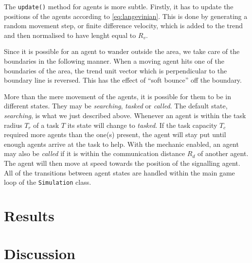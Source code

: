 \documentclass[11pt]{article}
\begin{document}
    The \lstinline!update()! method for agents is more subtle. Firstly, it has to 
    update the positions of the agents according to \autoref{eq:langevinian}. 
    This is done by generating a random movement step, or finite difference velocity,
    which is added to the trend and then normalised to have lenght equal to $R_v$.

    Since it is possible for an agent to wander outside the area, we take care of 
    the boundaries in the following manner. When a moving agent hits one of the
    boundaries of the area, the trend unit vector which is perpendicular to 
    the boundary line is reversed. This has the effect of ``soft bounce'' 
    off the boundary.

    More than the mere movement of the agents, it is possible for them to be in
    different states. They may be \emph{searching}, \emph{tasked} or \emph{called}.
    The default state, \emph{searching}, is what we just described above. Whenever
    an agent is within the task radius $T_r$ of a task $T$ its state will change 
    to \emph{tasked}. If the task capacity $T_c$ required more agents than the
    one(s) present, the agent will stay put until enough agents arrive at the 
    task to help. With the mechanic enabled, an agent may also be \emph{called}
    if it is within the communication distance $R_d$ of another agent. The agent 
    will then move at speed towards the position of the signalling agent. All of the 
    transitions between agent states are handled within the main game loop 
    of the \lstinline!Simulation! class.

    \section{Results}

    \section{Discussion}
    

    \printbibliography
\end{document}
